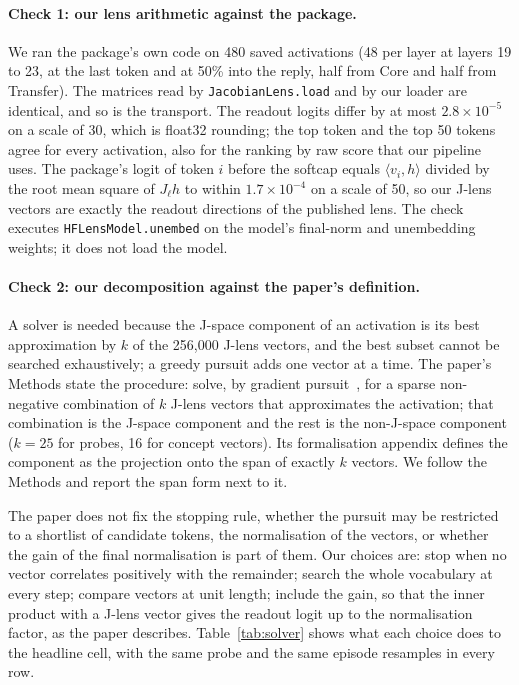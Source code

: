 \documentclass[11pt]{article}
\begin{document}
\paragraph{Check 1: our lens arithmetic against the package.} We ran the package's own code on 480 saved activations (48
per layer at layers 19 to 23, at the last token and at 50\% into the reply, half from Core and half from Transfer). The
matrices read by \texttt{JacobianLens.load} and by our loader are identical, and so is the transport. The readout logits
differ by at most $2.8\times10^{-5}$ on a scale of 30, which is float32 rounding; the top token and the top 50 tokens agree
for every activation, also for the ranking by raw score that our pipeline uses. The package's logit of token $i$ before the
softcap equals $\langle v_i,h\rangle$ divided by the root mean square of $J_\ell h$ to within $1.7\times10^{-4}$ on a scale
of 50, so our J-lens vectors are exactly the readout directions of the published lens. The check executes
\texttt{HFLensModel.unembed} on the model's final-norm and unembedding weights; it does not load the model.

\paragraph{Check 2: our decomposition against the paper's definition.} A solver is needed because the J-space component of
an activation is its best approximation by $k$ of the 256{,}000 J-lens vectors, and the best subset cannot be searched
exhaustively; a greedy pursuit adds one vector at a time. The paper's Methods state the procedure: solve, by gradient
pursuit~\cite{blumensath2008}, for a sparse non-negative combination of $k$ J-lens vectors that approximates the
activation; that combination is the J-space component and the rest is the non-J-space component ($k=25$ for probes, 16 for
concept vectors). Its formalisation appendix defines the component as the projection onto the span of exactly $k$ vectors.
We follow the Methods and report the span form next to it.

The paper does not fix the stopping rule, whether the pursuit may be restricted to a shortlist of candidate tokens, the
normalisation of the vectors, or whether the gain of the final normalisation is part of them. Our choices are: stop when no
vector correlates positively with the remainder; search the whole vocabulary at every step; compare vectors at unit length;
include the gain, so that the inner product with a J-lens vector gives the readout logit up to the normalisation factor, as
the paper describes. Table~\ref{tab:solver} shows what each choice does to the headline cell, with the same probe and the
same episode resamples in every row.
\end{document}
